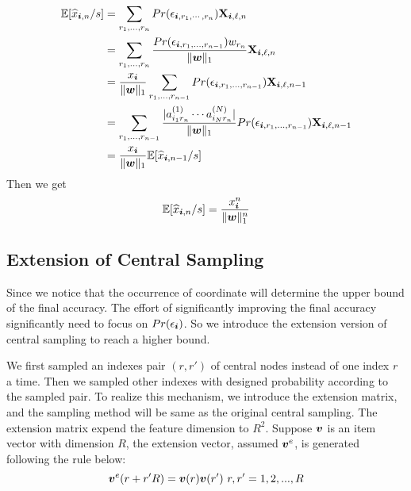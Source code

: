\documentclass[letterpaper]{article}
\newcommand{\Sca}[3]{{#1}^{(#2)}_{i_#2#3}}%
\newcommand{\V}[1]{{\bm{{\MakeLowercase{#1}}}}}
\newcommand{\M}[1]{{\bm{\mathbf{\MakeUppercase{#1}}}}}
\newcommand{\norm}[2]{\|#1\|_{#2}}
\begin{document}
\begin{align*}
\mathbb{E}[\widehat{x}_{\V{i},n}/s]
& = \sum_{r_1,\ldots,r_n}Pr(\epsilon_{\V{i},r_1,\cdots,r_n})\M{X}_{\V{i},\ell,n}\\
& = \sum_{r_1,\ldots,r_n}
\frac{Pr(\epsilon_{\V{i},r_1,\ldots,r_{n-1}})w_{r_n}}{\norm{\V{w}}{1}}\M{X}_{\V{i},\ell,n}\\
& = \frac{x_{\V{i}}}{\norm{\V{w}}{1}}\sum_{r_1,\ldots,r_{n-1}}
Pr(\epsilon_{\V{i},r_1,\ldots,r_{n-1}})\M{X}_{\V{i},\ell,n-1}\\
& = \sum_{r_1,\ldots,r_{n-1}} 
\frac{|\Sca{a}{1}{r_n}\cdots\Sca{a}{N}{r_n}|}{\norm{\V{w}}{1}}
Pr(\epsilon_{\V{i},r_1,\ldots,r_{n-1}})\M{X}_{\V{i},\ell,n-1}\\
& = \frac{x_{\V{i}}}{\norm{\V{w}}{1}}\mathbb{E}[\widehat{x}_{\V{i},n-1}/s]
\end{align*}
Then we get
\begin{equation}
\mathbb{E}[\widehat{x}_{\V{i},n}/s] = \frac{x^n_{\V{i}}}{\norm{\V{w}}{1}^n}
\end{equation}

\subsection{Extension of Central Sampling}

Since we notice that the occurrence of coordinate will determine the upper bound of the final accuracy. The effort of significantly improving the final accuracy significantly need to focus on $Pr(\epsilon_{\V{i}})$. So we introduce the extension version of central sampling to reach a higher bound.

We first sampled an indexes pair $(r,r')$ of central nodes instead of one index $r$ a time. Then we sampled other indexes with designed probability according to the sampled pair. To realize this mechanism, we introduce the extension matrix, and the sampling method will be same as the original central sampling. The extension matrix expend the feature dimension to $R^2$. Suppose $\V{v}$ is an item vector with dimension $R$, the extension vector, assumed $\V{v}^e$, is generated following the rule below:
\[
\V{v}^e(r+r'R) = \V{v}(r)\V{v}(r')\ r,r' = {1,2,...,R}
\]
\end{document}
